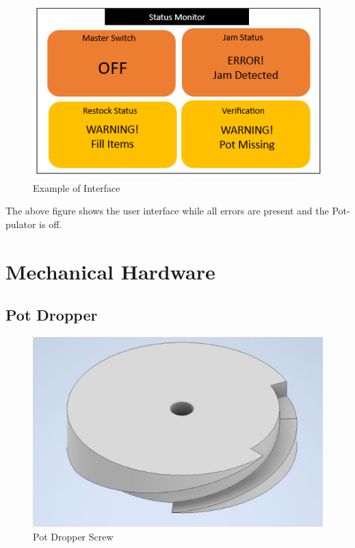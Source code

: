 \documentclass[12pt, titlepage]{article}
\begin{document}
\begin{figure}[H]
  \centering
\includegraphics{interface_new2.png}
\caption{Example of Interface}
  \label{fig:interface2}
\end{figure}
\noindent The above figure shows the user interface while all errors are present and the Pot-pulator is off. 

\section{Mechanical Hardware}

\subsection{Pot Dropper}
\begin{figure}[H]
  \centering
  \includegraphics{Pot_Dropper.jpg}
  \caption{Pot Dropper Screw}
  \label{fig:potdropper1}
\end{figure}
\end{document}
